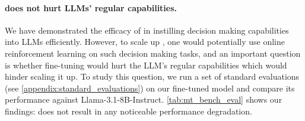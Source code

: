 \paragraph{\ours{} does not hurt LLMs' regular capabilities.} We have demonstrated the efficacy of \ours{} in instilling decision making capabilities into LLMs efficiently. However, to scale up \ours{}, one would potentially use online reinforcement learning on such decision making tasks, and an important question is whether \ours{} fine-tuning would hurt the LLM's regular capabilities which would hinder scaling it up. To study this question, we run a set of standard evaluations (see \cref{appendix:standard_evaluations}) on our \ours{} fine-tuned model and compare its performance against Llama-3.1-8B-Instruct. \cref{tab:mt_bench_eval} shows our findings: \ours{} does not result in any noticeable performance degradation.
